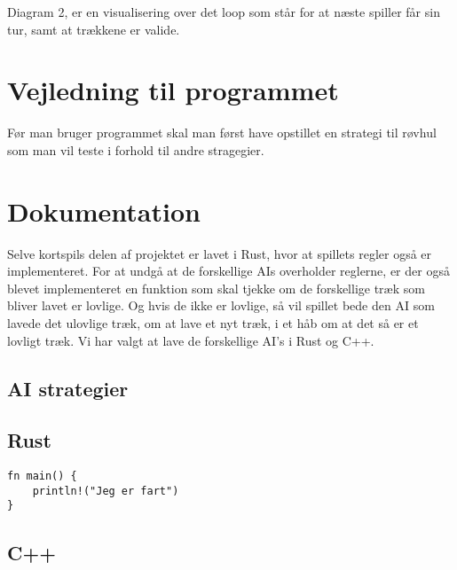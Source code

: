 \documentclass[a4paper, 12pt]{article}
\begin{document}
Diagram 2, er en visualisering over det loop som står for at næste spiller får sin tur, samt at trækkene er valide.

\section{Vejledning til programmet}

Før man bruger programmet skal man først have opstillet en strategi til røvhul som man vil teste i forhold til andre stragegier. 



\vfill
\pagebreak

\section{Dokumentation}

Selve kortspils delen af projektet er lavet i Rust, hvor at spillets regler også er implementeret. For at undgå at de forskellige AIs overholder reglerne, er der også blevet implementeret en funktion som skal tjekke om de forskellige træk som bliver lavet er lovlige. Og hvis de ikke er lovlige, så vil spillet bede den AI som lavede det ulovlige træk, om at lave et nyt træk, i et håb om at det så er et lovligt træk. Vi har valgt at lave de forskellige AI's i Rust og C++.

\subsection{AI strategier}







\vfill
\pagebreak


\subsection{Rust}


\begin{verbatim}
fn main() {
	println!("Jeg er fart")
}
\end{verbatim}


\subsection{C++}



\vfill
\pagebreak
\end{document}
